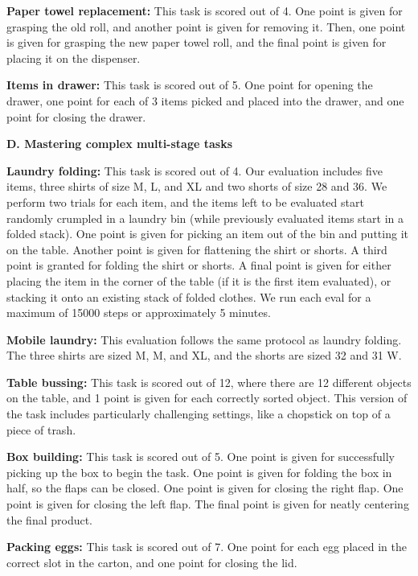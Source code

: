 \noindent \textbf{Paper towel replacement:} This task is scored out of 4. One point is given for grasping the old roll, and another point is given for removing it. Then, one point is given for grasping the new paper towel roll, and the final point is given for placing it on the dispenser. 

\noindent \textbf{Items in drawer:} This task is scored out of 5. One point for opening the drawer, one point for each of 3 items picked and placed into the drawer, and one point for closing the drawer. 

\noindent \textbf{D. Mastering complex multi-stage tasks}

\noindent \textbf{Laundry folding:} This task is scored out of 4. Our evaluation includes five items, three shirts of size M, L, and XL and two shorts of size 28 and 36. We perform two trials for each item, and the items left to be evaluated start randomly crumpled in a laundry bin (while previously evaluated items start in a folded stack). One point is given for picking an item out of the bin and putting it on the table. Another point is given for flattening the shirt or shorts. A third point is granted for folding the shirt or shorts. A final point is given for either placing the item in the corner of the table (if it is the first item evaluated), or stacking it onto an existing stack of folded clothes. We run each eval for a maximum of 15000 steps or approximately 5 minutes.

\noindent \textbf{Mobile laundry:} This evaluation follows the same protocol as laundry folding. The three shirts are sized M, M, and XL, and the shorts are sized 32 and 31 W.

\noindent \textbf{Table bussing:} This task is scored out of 12, where there are 12 different objects on the table, and 1 point is given for each correctly sorted object. This version of the task includes particularly challenging settings, like a chopstick on top of a piece of trash. 

\noindent \textbf{Box building:} This task is scored out of 5. One point is given for successfully picking up the box to begin the task. One point is given for folding the box in half, so the flaps can be closed. One point is given for closing the right flap. One point is given for closing the left flap. The final point is given for neatly centering the final product.

\noindent \textbf{Packing eggs:} This task is scored out of 7. One point for each egg placed in the correct slot in the carton, and one point for closing the lid.

